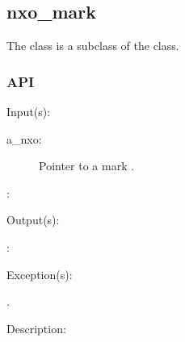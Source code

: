 %
%
%
%
%              

\subsection{nxo\_mark}
\label{nxo_mark}

The  class is a subclass of the  class.

\subsubsection{API}
\begin{capi}
\label{nxo_mark_}
	\begin{capilist}
	\item[Input(s): ]
		\begin{description}\item[]
		\item[a\_nxo: ]
			Pointer to a mark .
		\item[: ]
		\end{description}
	\item[Output(s): ]
		\begin{description}\item[]
		\item[: ]
		\end{description}
	\item[Exception(s): ]
		\begin{description}\item[]
		\item[.]
		\end{description}
	\item[Description: ]
	\end{capilist}
\end{capi}
